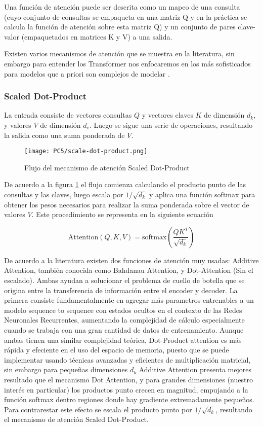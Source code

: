 \documentclass[conference]{IEEEtran}
\begin{document}
Una función de atención puede ser descrita como un mapeo de una consulta (cuyo conjunto de consultas se empaqueta en una matriz Q y en la práctica se calcula la función de atención sobre esta matriz Q) y un conjunto de pares clave-valor (empaquetados en matrices K y V) a una salida. 

Existen varios mecanismos de atención que se muestra en la literatura, sin embargo para entender los Transformer nos enfocaremos en los más sofisticados para modelos que a priori son complejos de modelar \cite{b4}.

\subsubsection{Scaled Dot-Product}
La entrada consiste de vectores consultas $Q$ y vectores claves $K$ de dimensión $d_k$, y valores $V$ de dimensión $d_v$. Luego se sigue una serie de operaciones, resultando la salida como una suma ponderada de $V$.

\begin{figure}[ht]
\centering
\texttt{[image: PC5/scale-dot-product.png]}
\caption{Flujo del mecanismo de atención Scaled Dot-Product \cite{b4}}
\label{fig::scale-dot-product}
\end{figure}

De acuerdo a la figura \ref{fig::scale-dot-product} el flujo comienza calculando el producto punto de las consultas y las claves, luego escala por $1/\sqrt{d_k}$ y aplica una función softmax para obtener los pesos necesarios para realizar la suma ponderada sobre el vector de valores $V$. Este procedimiento se representa en la siguiente ecuación

$$
\text{Attention}(Q,K,V)= \text{softmax}(\dfrac{QK^T}{\sqrt{d_k}})
$$

De acuerdo a la literatura existen dos funciones de atención muy usadas: Additive Attention, también conocida como Bahdanau Attention, y Dot-Attention (Sin el escalado). Ambas ayudan a solucionar el problema de cuello de botella que se origina entre la transferencia de información entre el encoder y decoder. La primera consiste fundamentalmente en agregar más parametros entrenables a un modelo sequence to sequence con estados ocultos en el contexto de las Redes Neuronales Recurrentes, aumentando la complejidad de cálculo especialmente cuando se trabaja con una gran cantidad de datos de entrenamiento. Aunque ambas tienen una similar complejidad teórica, Dot-Product attention es más rápida y efeciente en el uso del espacio de memoria, puesto que se puede implementar usando técnicas avanzadas y eficientes de multiplicación matricial, sin embargo para pequeñas dimensiones $d_k$ Additive Attention presenta mejores resultado que el mecanismo Dot Attention, y para grandes dimensiones (nuestro interés en particular) los productos punto crecen en magnitud, empujando a la función softmax dentro regiones donde hay gradiente extremadamente pequeños. Para contrarestar este efecto se escala el producto punto por $1/\sqrt{d_k}$, resultando el mecanismo de atención Scaled Dot-Product.
\end{document}
